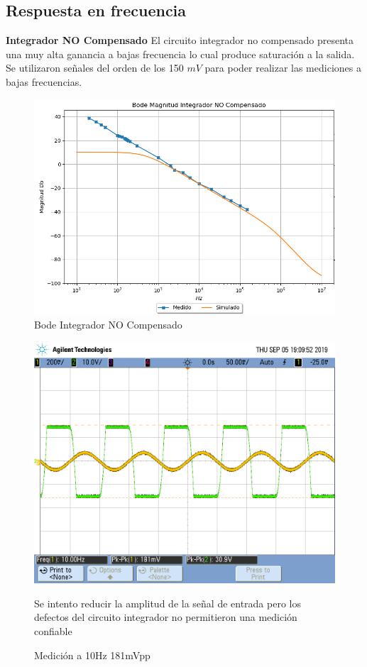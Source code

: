 \subsection{Respuesta en frecuencia}
\textbf{Integrador NO Compensado}
El circuito integrador no compensado presenta una muy alta ganancia a bajas frecuencia lo cual produce saturación a la salida. Se utilizaron señales del orden de los 150 $mV$ para poder realizar las mediciones a bajas frecuencias.
\begin{figure}[H]
	\centering
	\includegraphics[width=\textwidth]{Ejercicio4/SUPERPOSICION-BODE-INTEGRADOR-NO-COMPENSADO}
	\caption{Bode Integrador NO Compensado}
\end{figure}

\begin{figure}[H]
	\centering
	\includegraphics[width=\textwidth]{Ejercicio4/FOTOS-TP2-TC-EJ4/SaturaNoCompensado181mv}
	\caption{Medición a 10Hz 181mVpp}
Se intento reducir la amplitud de la señal de entrada pero los defectos del circuito integrador no permitieron una medición confiable
\end{figure}


